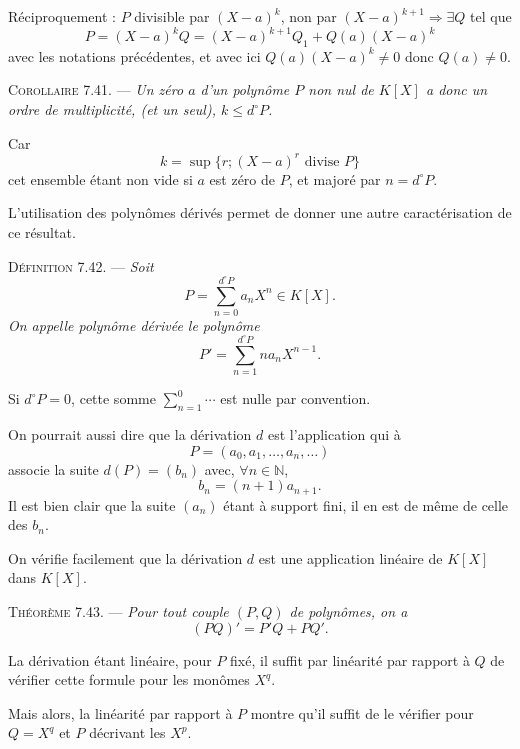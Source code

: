 Réciproquement : $P$ divisible par $(X-a)^k$, non par $(X-a)^{k+1}\Rightarrow\exists Q$ tel que
\[
P=(X-a)^kQ=(X-a)^{k+1}Q_1+Q(a)(X-a)^k
\]
avec les notations précédentes, et avec ici $Q(a)(X-a)^k\ne0$ donc $Q(a)\ne0$. \bookend

\medskip\noindent\textsc{Corollaire 7.41.} --- \emph{Un zéro $a$ d'un polynôme $P$ non nul de $K[X]$ a donc un ordre de multiplicité, (et un seul), $k\le d^\circ P$.}

Car
\[
k=\sup\{r;(X-a)^r\text{ divise }P\}
\]
cet ensemble étant non vide si $a$ est zéro de $P$, et majoré par $n=d^\circ P$. \bookend

L'utilisation des polynômes dérivés permet de donner une autre caractérisation de ce résultat.

\medskip\noindent\textsc{Définition 7.42.} --- \emph{Soit
\[
P=\sum_{n=0}^{d^\circ P}a_nX^n\in K[X].
\]
On appelle polynôme dérivée le polynôme
\[
P'=\sum_{n=1}^{d^\circ P}na_nX^{n-1}.
\]}

Si $d^\circ P=0$, cette somme $\sum_{n=1}^{0}\cdots$ est nulle par convention.

On pourrait aussi dire que la dérivation $d$ est l'application qui à
\[
P=(a_0,a_1,\ldots,a_n,\ldots)
\]
associe la suite $d(P)=(b_n)$ avec, $\forall n\in\mathbb N$,
\[
b_n=(n+1)a_{n+1}.
\]
Il est bien clair que la suite $(a_n)$ étant à support fini, il en est de même de celle des $b_n$.

On vérifie facilement que la dérivation $d$ est une application linéaire de $K[X]$ dans $K[X]$. 

\medskip\noindent\textsc{Théorème 7.43.} --- \emph{Pour tout couple $(P,Q)$ de polynômes, on a
\[
(PQ)'=P'Q+PQ'.
\]}

La dérivation étant linéaire, pour $P$ fixé, il suffit par linéarité par rapport à $Q$ de vérifier cette formule pour les monômes $X^q$.

Mais alors, la linéarité par rapport à $P$ montre qu'il suffit de le vérifier pour $Q=X^q$ et $P$ décrivant les $X^p$.

